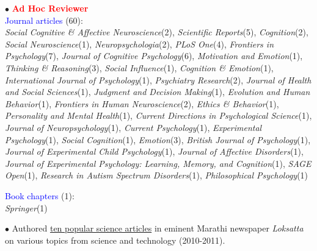 \documentclass[10pt]{article}
\begin{document}
	$\bullet$ \textcolor{red}{{\textbf{Ad Hoc Reviewer}}}\\
	\textcolor{blue}{{\hspace*{0.1in}Journal articles}} (60):\\
	\hspace*{0.1in}\textit{Social Cognitive \& Affective Neuroscience}(2), \textit{Scientific Reports}(5), \textit{Cognition}(2), \textit{Social Neuroscience}(1), 
	\hspace*{0.1in}\textit{Neuropsychologia}(2), \textit{PLoS One}(4), \textit{Frontiers in Psychology}(7), \textit{Journal of Cognitive Psychology}(6), 
	\hspace*{0.1in}\textit{Motivation and Emotion}(1), \textit{Thinking \& Reasoning}(3), \textit{Social Influence}(1), \textit{Cognition \& Emotion}(1),
	\hspace*{0.1in}\textit{International Journal of Psychology}(1),  \textit{Psychiatry Research}(2),
	\textit{Journal of Health and Social Sciences}(1),
	\hspace*{0.1in}\textit{Judgment and Decision Making}(1), \textit{Evolution and Human Behavior}(1),   \textit{Frontiers in Human Neuroscience}(2), 
	\hspace*{0.1in}\textit{Ethics \& Behavior}(1), \textit{Personality and Mental Health}(1),  \textit{Current Directions in Psychological Science}(1),
	\hspace*{0.1in}\textit{Journal of Neuropsychology}(1), \textit{Current Psychology}(1), \textit{Experimental Psychology}(1), \textit{Social Cognition}(1), 
	\hspace*{0.1in}\textit{Emotion}(3), \textit{British Journal of Psychology}(1), \textit{Journal of Experimental Child Psychology}(1), \textit{Journal of \hspace*{0.1in}Affective Disorders}(1), \textit{Journal of Experimental Psychology: Learning, Memory, and Cognition}(1), \textit{SAGE \hspace*{0.1in}Open}(1), \textit{Research in Autism Spectrum Disorders}(1), \textit{Philosophical Psychology}(1)  
	
	\textcolor{blue}{\hspace*{0.1in}Book chapters} (1):\\
	\hspace*{0.1in}\textit{Springer}(1)
	
	
	$\bullet$ Authored \href{https://drive.google.com/file/d/0B6_u70YpdJKnUUdoM2sydFRuTmNLaURUQ1FxaE9uTS1oVFRF/view?usp=sharing}{ten popular science articles} in eminent Marathi newspaper \textit{Loksatta} on various topics from science \hspace*{0.1in}and technology (2010-2011). 
	\miniskip
	
\end{document}
